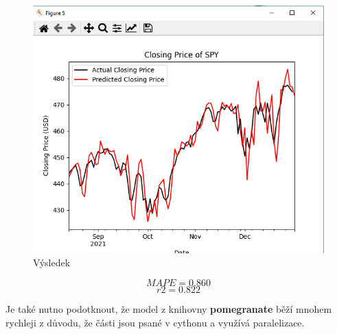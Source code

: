\begin{figure}[h]
    \includegraphics[width=1\textwidth]{img/pomegranate}
    \caption{Výsledek}
    \label{fig:pomegranate}
\end{figure}

\[MAPE = 0.860\]
\[r2 = 0.822\]

Je také nutno podotknout, že model z knihovny \textbf{pomegranate} běží mnohem rychleji z důvodu, že části jsou psané v cythonu a využívá
paralelizace.

\clearpage
